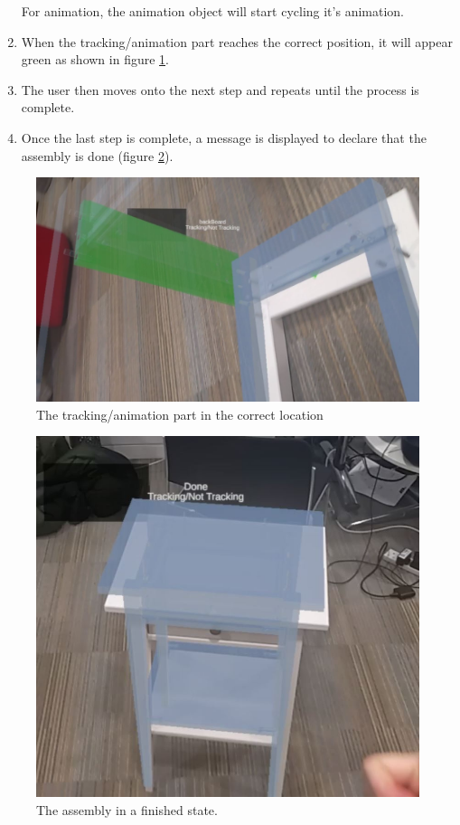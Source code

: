 \documentclass{l4proj}
\begin{document}
\begin{enumerate}
    For animation, the animation object will start cycling it's animation.
    \item When the tracking/animation part reaches the correct position, it will appear green as shown in figure \ref{fig:correctPos}.

    \item The user then moves onto the next step and repeats until the process is complete.
    \item Once the last step is complete, a message is displayed to declare that the assembly is done (figure \ref{fig:complete}).

    
\end{enumerate}

\clearpage

\begin{figure}[hbt!]
    \centering
    \includegraphics[width=0.7\linewidth]{dissertation//images/correctPos.JPG}
    \caption{The tracking/animation part in the correct location}
    \label{fig:correctPos}
\end{figure}

\begin{figure}[hbt!]
    \centering
    \includegraphics[width=0.5\linewidth]{dissertation//images/complete.JPG}
    \caption{The assembly in a finished state.}
    \label{fig:complete}
\end{figure}
\end{document}
